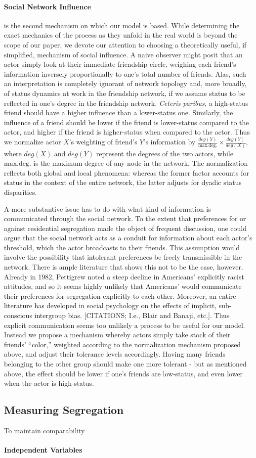 \documentclass[a4paper,10pt]{article}
\begin{document}
\paragraph{Social Network Influence} is the second mechanism on which our model is based. While determining the exact mechanics of the process as they unfold in the real world is beyond the scope of our paper, we devote our attention to choosing a theoretically useful, if simplified, mechanism of social influence. A naive observer might posit that an actor  simply look at their immediate friendship circle, weighing each friend's information inversely proportionally to one's total number of friends. Alas, such an interpretation is completely ignorant of network topology and, more broadly, of status dynamics at work in the friendship network, if we assume status to be reflected in one's degree in the friendship network. \textit{Ceteris paribus,} a high-status friend should have a higher influence than a lower-status one. Similarly, the influence of a friend should be lower if the friend is lower-status compared to the actor, and higher if the friend is higher-status when compared to the actor. Thus we normalize actor $X$'s weighting of friend's $Y$'s information by $\frac{deg(Y)}{\mathrm{max.deg.}} \times \frac{deg(Y)}{deg(X)}$, where $deg(X)$ and $deg(Y)$ represent the degrees of the two actors, while $\mathrm{max.deg.}$ is the maximum degree of any node in the network. The normalization reflects both global and local phenomena: whereas the former factor accounts for status in the context of the entire network, the latter adjusts for dyadic status disparities.

A more substantive issue has to do with what kind of information is communicated through the social network. To the extent that preferences for or against residential segregation made the object of frequent discussion, one could argue that the social network acts as a conduit for information about each actor's threshold, which the actor broadcasts to their friends. This assumption would involve the possibility that intolerant preferences be freely transmissible in the network. There is ample literature that shows this not to be the case, however. Already in 1982, Pettigrew noted a steep decline in Americans' explicitly racist attitudes, and so it seems highly unlikely that Americans' would communicate their preferences for segregation explicitly to each other. Moreover, an entire literature has developed in social psychology on the effects of implicit, sub-conscious intergroup bias. [CITATIONS; I.e., Blair and Banaji, etc.]. Thus explicit communication seems too unlikely a process to be useful for our model. Instead we propose a mechanism whereby actors simply take stock of their friends' ``color,'' weighted according to the normalization mechanism proposed above, and adjust their tolerance levels accordingly. Having many friends belonging to the other group should make one more tolerant - but as mentioned above, the effect should be lower if one's friends are low-status, and even lower when the actor is high-status.

\subsection{Measuring Segregation}

To maintain comparability 

\paragraph{Independent Variables}
\end{document}
